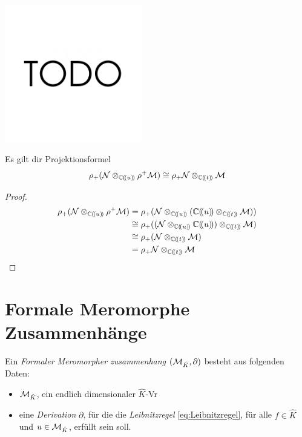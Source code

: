 \begin{exmp}
\begin{minipage}[hbt]{0,59\textwidth}
    \begin{center}
      \includegraphics[width=6cm]{img/TODO.png}
    \end{center}
  \end{minipage}
\end{exmp}

\begin{thm} \label{thm:Projektionsformel}
  Es gilt dir Projektionsformel
  \begin{equation} \label{eq:Projektionsformel}
    \rho_+(\mathcal{N}\otimes_{\mathbb{C}(\!(u)\!)}\rho^+\mathcal{M}) \cong
    \rho_+\mathcal{N}\otimes_{\mathbb{C}(\!(t)\!)}\mathcal{M}
  \end{equation}
\end{thm}
\begin{proof}
  \begin{align*}
    \rho_+(\cN\otimes_{\C(\!(u)\!)}\rho^+\cM) &=
    \rho_+(\cN\otimes_{\C(\!(u)\!)}(\C(\!(u)\!)\otimes_{\C(\!(t)\!)}\cM)) \\
    &\cong \rho_+((\cN\otimes_{\C(\!(u)\!)}\C(\!(u)\!))
    \otimes_{\C(\!(t)\!)}\cM) \\
    &\cong \rho_+(\cN\otimes_{\C(\!(t)\!)}\cM) \\
    &= \rho_+\cN\otimes_{\C(\!(t)\!)}\cM \\
  \end{align*}
\end{proof}

\section{Formale Meromorphe Zusammenhänge}

\begin{defn}
  Ein \emph{Formaler Meromorpher zusammenhang} $(\mathcal{M}_{\hat{K}},\partial)$ besteht aus 
  folgenden Daten:
  \begin{itemize}
    \item $\mathcal{M}_{\hat{K}}$, ein endlich dimensionaler $\hat K$-Vr
    \item eine \emph{Derivation} $\partial$, für die die \emph{Leibnitzregel} 
      \eqref{eq:Leibnitzregel}, für alle $f\in \hat K$ und $u\in \mathcal{M}_{\hat K}$,
      erfüllt sein soll.
  \end{itemize}
\end{defn}

